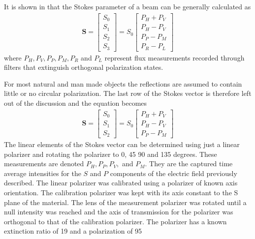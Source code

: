 It is shown in \cite{chipman} that the Stokes parameter of a beam can be generally calculated as
%
\begin{align}
    \mathbf{S} =
    \begin{bmatrix}
        S_0 \\
        S_1 \\
        S_2 \\
        S_3
    \end{bmatrix}
    =
    S_0
    \begin{bmatrix}
        P_H + P_V \\
        P_H - P_V \\
        P_P - P_M \\
        P_R - P_L
    \end{bmatrix}
\end{align}
%
where $P_H, P_V, P_P, P_M, P_R$ and $P_L$ represent flux measurements recorded through filters that extinguish orthogonal polarization states.

For most natural and man made objects the reflections are assumed to contain little or no circular polarization. The last row of the Stokes vector is therefore left out of the discussion and the equation becomes
%
\begin{align}
    \mathbf{S} =
    \begin{bmatrix}
        S_0 \\
        S_1 \\
        S_2
    \end{bmatrix}
    =
    S_0
    \begin{bmatrix}
        P_H + P_V \\
        P_H - P_V \\
        P_P - P_M
    \end{bmatrix}
\end{align}
%
The linear elements of the Stokes vector can be determined using just a linear polarizer and rotating the polarizer to 0, 45 90 and 135 degrees.  These measurements are denoted $P_H, P_P, P_V,$ and $P_M$. They are the captured time average intensities for the $S$ and $P$ components of the electric field previously described.
%
%
The linear polarizer was calibrated using a polarizer of known axis orientation.  The calibration polarizer was kept with its axis constant to the S plane of the material.  The lens of the measurement polarizer was rotated until a null intensity was reached and the axis of transmission for the polarizer was orthogonal to that of the calibration polarizer.  The polarizer has a known extinction ratio of 19 and a polarization of 95%

